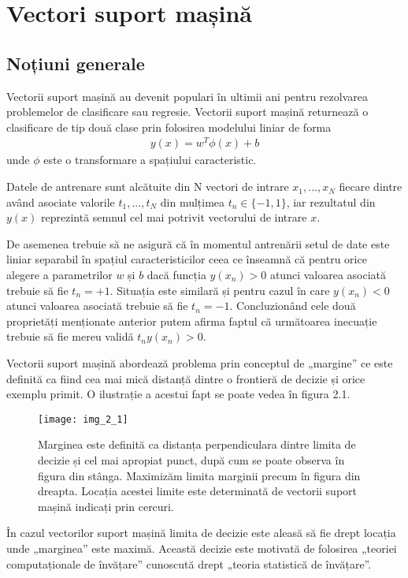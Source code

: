 \section{Vectori suport mașină}

\subsection{Noțiuni generale}

Vectorii suport mașină au devenit populari în ultimii ani pentru rezolvarea problemelor de clasificare sau regresie. Vectorii suport mașină returnează o clasificare de tip două clase prin folosirea modelului liniar de forma
\begin{align}
	y(x) = w^T\phi(x) + b
\end{align}
unde $\phi$ este o transformare a spațiului caracteristic.

Datele de antrenare sunt alcătuite din N vectori de intrare $x_1, ...,x_N$ fiecare dintre având asociate valorile $t_1, ...,t_N$ din mulțimea $t_n \in \{-1,1\}$, iar rezultatul din $y(x)$ reprezintă semnul cel mai potrivit vectorului de intrare $x$.

De asemenea trebuie să ne asigură că în momentul antrenării setul de date este liniar separabil în spațiul caracteristicilor ceea ce înseamnă că pentru orice alegere a parametrilor $w$ și $b$ dacă funcția $y(x_n) > 0$ atunci valoarea asociată trebuie să fie $t_n = +1$. Situația este similară și pentru cazul în care $y(x_n ) < 0$ atunci valoarea asociată trebuie să fie $t_n = -1$. Concluzionând cele două proprietăți menționate anterior putem afirma faptul că următoarea inecuație trebuie să fie mereu validă  $t_n y(x_n) > 0$. 

Vectorii suport mașină abordează problema prin conceptul de „margine” ce este definită ca fiind cea mai mică distanță dintre o frontieră de decizie și orice exemplu primit. O ilustrație a acestui fapt se poate vedea în figura 2.1.
\begin{figure}[!h]
	\centering
	\texttt{[image: img\_2\_1]}
	\caption[Vectori suport mașină]{Marginea este definită ca distanța perpendiculara dintre limita de decizie și cel mai apropiat punct, după cum se poate observa în figura din stânga. Maximizăm limita marginii precum în figura din dreapta. Locația acestei limite este determinată de vectorii suport mașină indicați prin cercuri.}
\end{figure} 

În cazul vectorilor suport mașină limita de decizie este aleasă să fie drept locația unde „marginea” este maximă. Această decizie este motivată de folosirea „teoriei computaționale de învățare” cunoscută drept „teoria statistică de învățare”. 

